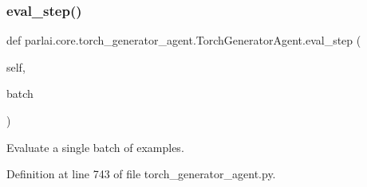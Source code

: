 \subsubsection{\texorpdfstring{eval\+\_\+step()}{eval\_step()}}
{\footnotesize\ttfamily def parlai.\+core.\+torch\+\_\+generator\+\_\+agent.\+Torch\+Generator\+Agent.\+eval\+\_\+step (\begin{DoxyParamCaption}\item[{}]{self,  }\item[{}]{batch }\end{DoxyParamCaption})}

\begin{DoxyVerb}Evaluate a single batch of examples.
\end{DoxyVerb}
 

Definition at line 743 of file torch\+\_\+generator\+\_\+agent.\+py.


